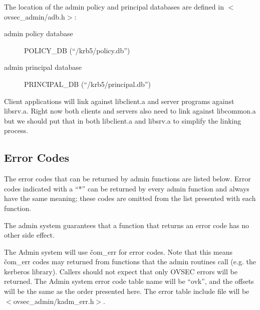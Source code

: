 The location of the admin policy and principal databases are defined
in $<$ovsec_admin/adb.h$>$:

\begin{description}
\item[admin policy database] POLICY_DB (``/krb5/policy.db'')
\item[admin principal database] PRINCIPAL_DB (``/krb5/principal.db'')
\end{description}

Client applications will link against libclient.a and server programs
against libsrv.a. Right now both clients and servers also need to link
against libcommon.a but we should put that in both libclient.a and
libsrv.a to simplify the linking process.

\subsection{Error Codes}

The error codes that can be returned by admin functions are listed
below.  Error codes indicated with a ``*'' can be returned by every
admin function and always have the same meaning; these codes are
omitted from the list presented with each function.  

The admin system guarantees that a function that returns an error code
has no other side effect.

The Admin system will use \v{com_err} for error codes.  Note that this
means \v{com_err} codes may returned from functions that the admin
routines call (e.g. the kerberos library). Callers should not expect
that only OVSEC errors will be returned.  The Admin system error code
table name will be ``ovk'', and the offsets will be the same as the
order presented here. The error table include file will be
$<$ovsec_admin/kadm_err.h$>$.

